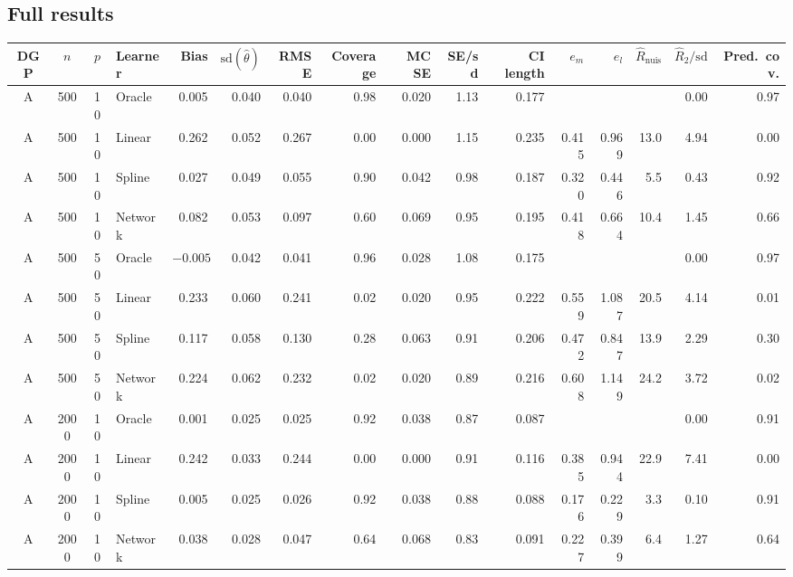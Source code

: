 \documentclass[11pt,a4paper]{article}
\newcommand{\Rnuis}{\hat R_{\mathrm{nuis}}}
\begin{document}
\begin{landscape}
\section{Full results}\label{app:full}
\begin{center}\scriptsize
{}\label{tab:full}
\setlength{\tabcolsep}{4pt}
\begin{tabular}{cccl rrr rr r r rr r r r}
\toprule
DGP & $n$ & $p$ & Learner & Bias & $\mathrm{sd}(\hat\theta)$ & RMSE & Coverage & MC SE & SE/sd & CI length & $e_m$ & $e_l$ & $\Rnuis$ & $\hat R_2/\mathrm{sd}$ & Pred.\ cov.\\
\midrule
A & 500 & 10 & Oracle & 0.005 & 0.040 & 0.040 & 0.98 & 0.020 & 1.13 & 0.177 &  &  &  & 0.00 & 0.97\\
A & 500 & 10 & Linear & 0.262 & 0.052 & 0.267 & 0.00 & 0.000 & 1.15 & 0.235 & 0.415 & 0.969 & 13.0 & 4.94 & 0.00\\
A & 500 & 10 & Spline & 0.027 & 0.049 & 0.055 & 0.90 & 0.042 & 0.98 & 0.187 & 0.320 & 0.446 & 5.5 & 0.43 & 0.92\\
A & 500 & 10 & Network & 0.082 & 0.053 & 0.097 & 0.60 & 0.069 & 0.95 & 0.195 & 0.418 & 0.664 & 10.4 & 1.45 & 0.66\\
A & 500 & 50 & Oracle & $-0.005$ & 0.042 & 0.041 & 0.96 & 0.028 & 1.08 & 0.175 &  &  &  & 0.00 & 0.97\\
A & 500 & 50 & Linear & 0.233 & 0.060 & 0.241 & 0.02 & 0.020 & 0.95 & 0.222 & 0.559 & 1.087 & 20.5 & 4.14 & 0.01\\
A & 500 & 50 & Spline & 0.117 & 0.058 & 0.130 & 0.28 & 0.063 & 0.91 & 0.206 & 0.472 & 0.847 & 13.9 & 2.29 & 0.30\\
A & 500 & 50 & Network & 0.224 & 0.062 & 0.232 & 0.02 & 0.020 & 0.89 & 0.216 & 0.608 & 1.149 & 24.2 & 3.72 & 0.02\\
A & 2000 & 10 & Oracle & 0.001 & 0.025 & 0.025 & 0.92 & 0.038 & 0.87 & 0.087 &  &  &  & 0.00 & 0.91\\
A & 2000 & 10 & Linear & 0.242 & 0.033 & 0.244 & 0.00 & 0.000 & 0.91 & 0.116 & 0.385 & 0.944 & 22.9 & 7.41 & 0.00\\
A & 2000 & 10 & Spline & 0.005 & 0.025 & 0.026 & 0.92 & 0.038 & 0.88 & 0.088 & 0.176 & 0.229 & 3.3 & 0.10 & 0.91\\
A & 2000 & 10 & Network & 0.038 & 0.028 & 0.047 & 0.64 & 0.068 & 0.83 & 0.091 & 0.227 & 0.399 & 6.4 & 1.27 & 0.64\\

\end{tabular}
\end{center}
\end{landscape}
\end{document}
